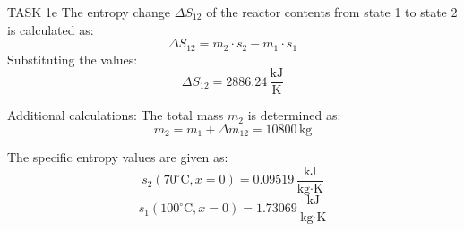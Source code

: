 TASK 1e  
The entropy change \( \Delta S_{12} \) of the reactor contents from state 1 to state 2 is calculated as:  
\[
\Delta S_{12} = m_2 \cdot s_2 - m_1 \cdot s_1
\]  
Substituting the values:  
\[
\Delta S_{12} = 2886.24 \, \frac{\text{kJ}}{\text{K}}
\]  

Additional calculations:  
The total mass \( m_2 \) is determined as:  
\[
m_2 = m_1 + \Delta m_{12} = 10800 \, \text{kg}
\]  

The specific entropy values are given as:  
\[
s_2(70^\circ\text{C}, x=0) = 0.09519 \, \frac{\text{kJ}}{\text{kg·K}}
\]  
\[
s_1(100^\circ\text{C}, x=0) = 1.73069 \, \frac{\text{kJ}}{\text{kg·K}}
\]